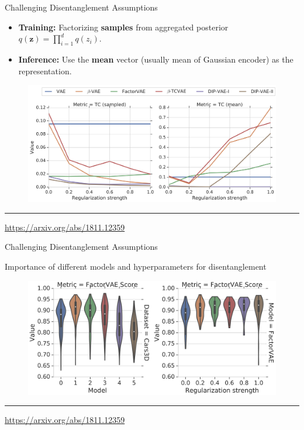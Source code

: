 \documentclass{beamer}
\newcommand{\bz}{\mathbf{z}}
\begin{document}
\begin{frame}{Challenging Disentanglement Assumptions}
	\begin{itemize}
		\item \textbf{Training:} Factorizing \textbf{samples} from aggregated posterior $q(\bz) = \prod_{i=1}^d q(z_i)$.
		\item \textbf{Inference:} Use the \textbf{mean} vector (usually mean of Gaussian encoder) as the representation.
	\end{itemize}
	\begin{figure}
		\centering
		\includegraphics[width=0.95\linewidth]{figs/challenge_dis_1}
	\end{figure}
	\vfill
	\hrule\medskip
	{\scriptsize \href{https://arxiv.org/abs/1811.12359}{https://arxiv.org/abs/1811.12359}}
\end{frame}
\begin{frame}{Challenging Disentanglement Assumptions}
	\begin{block}{Importance of different models and hyperparameters for disentanglement}
		\begin{figure}
			\centering
			\includegraphics[width=\linewidth]{figs/challenge_dis_2}
		\end{figure}
	\end{block}
	\vfill
	\hrule\medskip
	{\scriptsize \href{https://arxiv.org/abs/1811.12359}{https://arxiv.org/abs/1811.12359}}
\end{frame}
\end{document}
